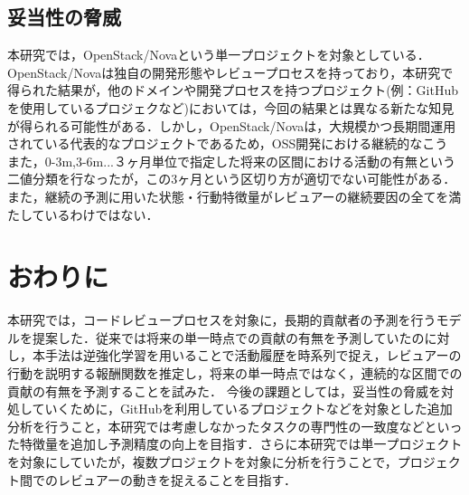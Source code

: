 \documentclass[submit,techrep,noauthor]{ipsj}
\begin{document}
\subsection{妥当性の脅威}
本研究では，OpenStack/Novaという単一プロジェクトを対象としている．OpenStack/Novaは独自の開発形態やレビュープロセスを持っており，本研究で得られた結果が，他のドメインや開発プロセスを持つプロジェクト(例：GitHubを使用しているプロジェクなど)においては，今回の結果とは異なる新たな知見が得られる可能性がある．しかし，OpenStack/Novaは，大規模かつ長期間運用されている代表的なプロジェクトであるため，OSS開発における継続的なこう
また，0-3m,3-6m...３ヶ月単位で指定した将来の区間における活動の有無という二値分類を行なったが，この3ヶ月という区切り方が適切でない可能性がある．また，継続の予測に用いた状態・行動特徴量がレビュアーの継続要因の全てを満たしているわけではない．

\section{おわりに}
\label{sec:conclusion}
本研究では，コードレビュープロセスを対象に，長期的貢献者の予測を行うモデルを提案した．従来では将来の単一時点での貢献の有無を予測していたのに対し，本手法は逆強化学習を用いることで活動履歴を時系列で捉え，レビュアーの行動を説明する報酬関数を推定し，将来の単一時点ではなく，連続的な区間での貢献の有無を予測することを試みた．
 今後の課題としては，妥当性の脅威を対処していくために，GitHubを利用しているプロジェクトなどを対象とした追加分析を行うこと，本研究では考慮しなかったタスクの専門性の一致度などといった特徴量を追加し予測精度の向上を目指す．さらに本研究では単一プロジェクトを対象にしていたが，複数プロジェクトを対象に分析を行うことで，プロジェクト間でのレビュアーの動きを捉えることを目指す．




\end{document}
